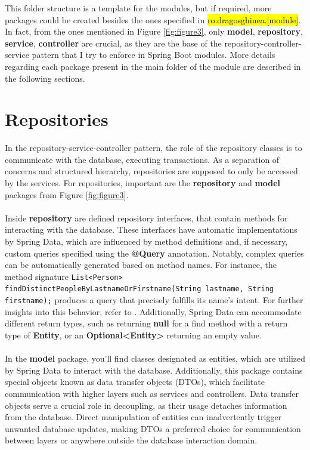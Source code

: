 \noindent This folder structure is a template for the modules, but if required, more packages could be created besides the ones specified in \hl{ro.dragosghinea.[module]}. In fact, from the ones mentioned in Figure \ref{fig:figure3}, only \textbf{model}, \textbf{repository}, \textbf{service}, \textbf{controller} are crucial, as they are the base of the repository-controller-service pattern that I try to enforce in Spring Boot modules. More details regarding each package present in the main folder of the module are described in the following sections.

\section{Repositories}

In the repository-service-controller pattern, the role of the repository classes is to communicate with the database, executing transactions. As a separation of concerns and structured hierarchy, repositories are supposed to only be accessed by the services. For repositories, important are the \textbf{repository} and \textbf{model} packages from Figure \ref{fig:figure3}.
\\\\
\noindent Inside \textbf{repository} are defined repository interfaces, that contain methods for interacting with the database. These interfaces have automatic implementations by Spring Data, which are influenced by method definitions and, if necessary, custom queries specified using the \textbf{@Query} annotation. Notably, complex queries can be automatically generated based on method names. For instance, the method signature \verb|List<Person>| \verb|findDistinctPeopleByLastnameOrFirstname(String lastname, String firstname);| produces a query that precisely fulfills its name's intent. For further insights into this behavior, refer to \cite{spring-data-repositories}. Additionally, Spring Data can accommodate different return types, such as returning \textbf{null} for a find method with a return type of \textbf{Entity}, or an \textbf{Optional<Entity>} returning an empty value.
\\\\
\noindent In the \textbf{model} package, you'll find classes designated as entities, which are utilized by Spring Data to interact with the database. Additionally, this package contains special objects known as data transfer objects (DTOs), which facilitate communication with higher layers such as services and controllers. Data transfer objects serve a crucial role in decoupling, as their usage detaches information from the database. Direct manipulation of entities can inadvertently trigger unwanted database updates, making DTOs a preferred choice for communication between layers or anywhere outside the database interaction domain.

